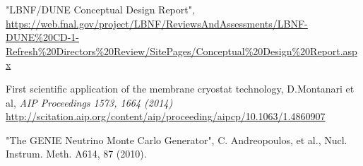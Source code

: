 \begin{thebibliography}{99}

%

%
%

%
%


%
%

%
%


%
%


%
%


%
%



 "LBNF/DUNE Conceptual Design Report",  \url{https://web.fnal.gov/project/LBNF/ReviewsAndAssessments/LBNF-DUNE\%20CD-1-Refresh\%20Directors\%20Review/SitePages/Conceptual\%20Design\%20Report.aspx}

 First scientific application of the membrane cryostat technology, D.Montanari et al, \textit{AIP Proceedings 1573, 1664 (2014)} \url{http://scitation.aip.org/content/aip/proceeding/aipcp/10.1063/1.4860907}

 "The GENIE Neutrino Monte Carlo Generator", C. Andreopoulos, et al., Nucl. Instrum. Meth. A614, 87 (2010).



\end{thebibliography}
